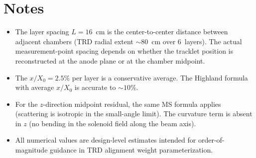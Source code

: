 \documentclass[11pt,a4paper]{article}
\begin{document}
\section{Notes}

\begin{itemize}
\item The layer spacing $L = 16$~cm is the center-to-center distance
      between adjacent chambers (TRD radial extent ${\sim}80$~cm over
      6~layers).  The actual measurement-point spacing depends on
      whether the tracklet position is reconstructed at the anode plane
      or at the chamber midpoint.

\item The $x/X_0 = 2.5\%$ per layer is a conservative average.
      The Highland formula with average $x/X_0$ is accurate to
      ${\sim}10\%$.

\item For the $z$-direction midpoint residual, the same MS formula
      applies (scattering is isotropic in the small-angle limit).
      The curvature term is absent in $z$ (no bending in the
      solenoid field along the beam axis).

\item All numerical values are design-level estimates intended for
      order-of-magnitude guidance in TRD alignment weight
      parameterization.
\end{itemize}
\end{document}
